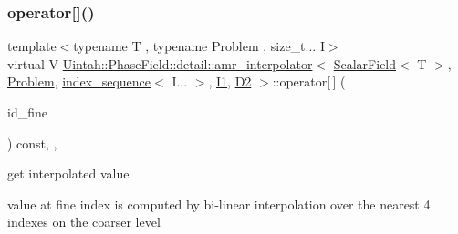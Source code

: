 \mbox{\label{classUintah_1_1PhaseField_1_1detail_1_1amr__interpolator_3_01ScalarField_3_01T_01_4_00_01Problemd2db9de1754b5450c93c191a9275f5ed_a92258242d6be3d033373def65b687a94}} 
\subsubsection{\texorpdfstring{operator[]()}{operator[]()}\hspace{0.1cm}{\footnotesize\ttfamily [2/2]}}
{\footnotesize\ttfamily template$<$typename T , typename Problem , size\+\_\+t... I$>$ \\
virtual V \hyperlink{classUintah_1_1PhaseField_1_1detail_1_1amr__interpolator}{Uintah\+::\+Phase\+Field\+::detail\+::amr\+\_\+interpolator}$<$ \hyperlink{structUintah_1_1PhaseField_1_1ScalarField}{Scalar\+Field}$<$ T $>$, \hyperlink{classUintah_1_1PhaseField_1_1Problem}{Problem}, \hyperlink{namespaceUintah_1_1PhaseField_a237de804d99512e50613aff7c94a9461}{index\+\_\+sequence}$<$ I... $>$, \hyperlink{namespaceUintah_1_1PhaseField_a547ce3002aa97fbd3ef3192a6eec8406a66f19efe774b0d2b6e5844eb2d83d305}{I1}, \hyperlink{namespaceUintah_1_1PhaseField_a12bfc68444894dffdf0cb8d9cf0cc76aa1a451dae278b0103a94105c8776e9a67}{D2} $>$\+::operator\mbox{[}$\,$\mbox{]} (\begin{DoxyParamCaption}\item[{const Int\+Vector \&}]{id\+\_\+fine }\end{DoxyParamCaption}) const\hspace{0.3cm}{\ttfamily [inline]}, {\ttfamily [override]}, {\ttfamily [virtual]}}



get interpolated value 

value at fine index is computed by bi-\/linear interpolation over the nearest 4 indexes on the coarser level


